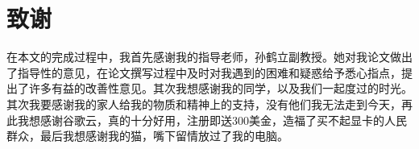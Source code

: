 % 
\section{致谢}
在本文的完成过程中，我首先感谢我的指导老师，孙鹤立副教授。她对我论文做出了指导性的意见，在论文撰写过程中及时对我遇到的困难和疑惑给予悉心指点，提出了许多有益的改善性意见。其次我想感谢我的同学，以及我们一起度过的时光。其次我要感谢我的家人给我的物质和精神上的支持，没有他们我无法走到今天，再此我想感谢谷歌云，真的十分好用，注册即送300美金，造福了买不起显卡的人民群众，最后我想感谢我的猫，嘴下留情放过了我的电脑。
% 